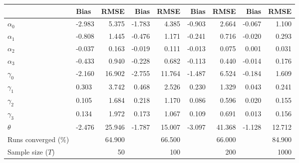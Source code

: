 
\begin{tabular}[t]{llrrrrrrr}
\toprule
  & Bias & RMSE & Bias & RMSE & Bias & RMSE & Bias & RMSE\\
\midrule
$\alpha_{0}$ & -2.983 & 5.375 & -1.783 & 4.385 & -0.903 & 2.664 & -0.067 & 1.100\\
$\alpha_{1}$ & -0.808 & 1.445 & -0.476 & 1.171 & -0.241 & 0.716 & -0.020 & 0.293\\
$\alpha_{2}$ & -0.037 & 0.163 & -0.019 & 0.111 & -0.013 & 0.075 & 0.001 & 0.031\\
$\alpha_{3}$ & -0.433 & 0.940 & -0.228 & 0.682 & -0.113 & 0.440 & -0.014 & 0.176\\
$\gamma_{0}$ & -2.160 & 16.902 & -2.755 & 11.764 & -1.487 & 6.524 & -0.184 & 1.609\\
$\gamma_{1}$ & 0.303 & 3.742 & 0.468 & 2.526 & 0.230 & 1.329 & 0.043 & 0.241\\
$\gamma_{2}$ & 0.105 & 1.684 & 0.218 & 1.170 & 0.086 & 0.596 & 0.020 & 0.155\\
$\gamma_{3}$ & 0.134 & 1.972 & 0.173 & 1.067 & 0.109 & 0.691 & 0.013 & 0.156\\
$\theta$ & -2.476 & 25.946 & -1.787 & 15.007 & -3.097 & 41.368 & -1.128 & 12.712\\
Runs converged (\%) &  & 64.900 &  & 66.500 &  & 66.000 &  & 84.900\\
Sample size ($T$) &  & 50 &  & 100 &  & 200 &  & 1000\\
\bottomrule
\end{tabular}
